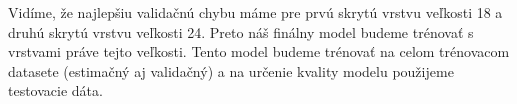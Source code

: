 Vidíme, že najlepšiu validačnú chybu máme pre prvú skrytú vrstvu veľkosti 18 a druhú skrytú vrstvu veľkosti 24. Preto náš finálny model budeme trénovať s vrstvami práve tejto veľkosti. Tento model budeme trénovať na celom trénovacom datasete (estimačný aj validačný) a na určenie kvality modelu použijeme testovacie dáta.